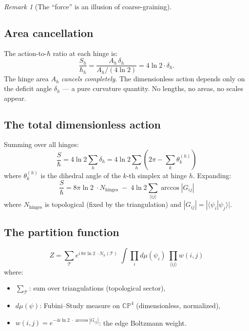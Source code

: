 \documentclass[12pt]{article}
\theoremstyle{remark}
\newtheorem{remark}[theorem]{Remark}
\theoremstyle{definition}
\begin{document}
\begin{remark}[The ``force'' is an illusion of coarse-graining]
\subsection{Area cancellation}

The action-to-$\hbar$ ratio at each hinge is:
\begin{equation}
\frac{S_h}{\hbar_h} = \frac{A_h\,\delta_h}{A_h/(4\ln 2)} = 4\ln 2 \cdot \delta_h.
\end{equation}
The hinge area $A_h$ \emph{cancels completely}. The dimensionless action depends only on the deficit angle $\delta_h$ --- a pure curvature quantity. No lengths, no areas, no scales appear.

\subsection{The total dimensionless action}

Summing over all hinges:
\begin{equation}
\frac{S}{\hbar} = 4\ln 2\sum_h \delta_h = 4\ln 2\sum_h \left(2\pi - \sum_{k} \theta_k^{(h)}\right)
\end{equation}
where $\theta_k^{(h)}$ is the dihedral angle of the $k$-th simplex at hinge $h$. Expanding:
\begin{equation}
\boxed{\frac{S}{\hbar} = 8\pi\ln 2\;\cdot N_\text{hinges} \;-\; 4\ln 2\!\!\sum_{\langle ij\rangle}\!\! \arccos|G_{ij}|}
\end{equation}
where $N_\text{hinges}$ is topological (fixed by the triangulation) and $|G_{ij}| = |\langle\psi_i|\psi_j\rangle|$.

\subsection{The partition function}

\begin{equation}
\boxed{Z = \sum_{\mathcal{T}} e^{i\,8\pi\ln 2\;\cdot N_h(\mathcal{T})}\;\int\!\prod_i d\mu(\psi_i)\;\prod_{\langle ij\rangle} w(i,j)}
\end{equation}
where:
\begin{itemize}
\item $\sum_\mathcal{T}$: sum over triangulations (topological sector),
\item $d\mu(\psi)$: Fubini--Study measure on $\mathbb{CP}^4$ (dimensionless, normalized),
\item $w(i,j) = e^{-4i\ln 2\;\cdot\arccos|G_{ij}|}$: the edge Boltzmann weight.
\end{itemize}


\end{remark}
\end{document}
